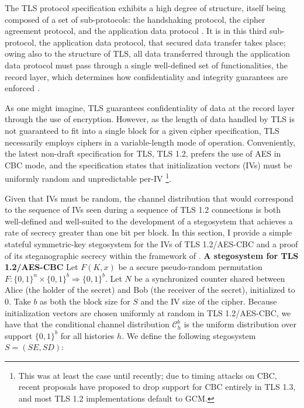 \documentclass{article}
\begin{document}
The TLS protocol specification exhibits a high degree of structure, itself being composed of a set of 
sub-protocols: the handshaking protocol, the cipher agreement protocol, and the application data protocol 
\cite{tls12}.  It is in this third sub-protocol, the application data protocol, that secured data 
transfer takes place; owing also to the structure of TLS, all data transferred through the application 
data protocol must pass through a single well-defined set of functionalities, the record layer, which 
determines how confidentiality and integrity guarantees are enforced \cite{tls12}.

As one might imagine, TLS guarantees confidentiality of data at the record layer through the use of encryption.  However, 
as the length of data handled by TLS is not guaranteed to fit into a single block for a given cipher specification, 
TLS necessarily employs ciphers in a variable-length mode of operation.  Conveniently, the latest non-draft specification for 
TLS, TLS 1.2, prefers the use of AES in CBC mode, and the specification states that initialization vectors (IVs) must be 
uniformly random and unpredictable per-IV \cite{tls12} \footnote{This was at least the case until recently; 
due to timing attacks on CBC, recent proposals have proposed to drop support for CBC entirely in TLS 1.3, and most TLS 1.2 implementations 
default to GCM.}.

Given that IVs must be random, the channel distribution that would correspond to the sequence of IVs seen during a sequence of 
TLS 1.2 connections is both well-defined and well-suited to the development of a stegosystem that achieves a rate of secrecy 
greater than one bit per block.  In this section, I provide a simple stateful symmetric-key stegosystem for the IVs of TLS 1.2/AES-CBC and a proof of its 
steganographic secrecy within the framework of \cite{BiglouPSS}.
\newline\newline
\noindent \textbf{A stegosystem for TLS 1.2/AES-CBC }  Let $F(K,x)$ be a secure pseudo-random permutation $F: \{0,1\}^n \times \{0,1\}^b \Rightarrow \{0,1\}^b$.
Let $N$ be a synchronized counter shared between Alice (the holder of the secret) and Bob (the receiver of the secret), initialized to 0.
Take $b$ as both the block size for $S$ and the IV size of the cipher.  Because initialization vectors 
are chosen uniformly at random in TLS 1.2/AES-CBC, we have that the conditional channel distribution $\mathcal{C}_h^b$ is the uniform distribution over support $\{0,1\}^b$ for all histories $h$.  We define the following stegosystem $S=(SE,SD)$:
\end{document}
